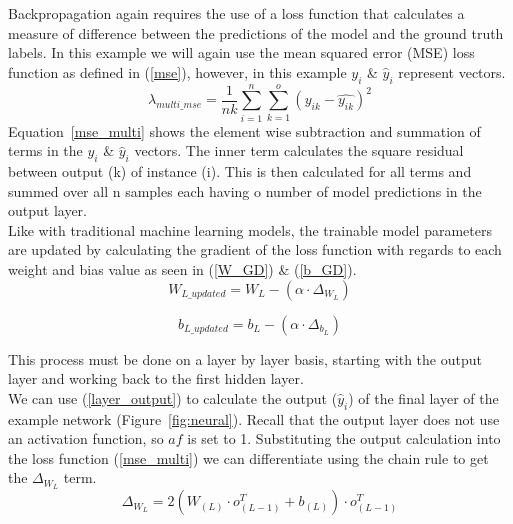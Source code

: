 \noindent
Backpropagation again requires the use of a loss function that calculates a measure of difference between the predictions of the model and the ground truth labels. In this example we will again use the mean squared error (MSE) loss function as defined in (\ref{mse}), however, in this example $y_i$ \& $\hat{y}_i$ represent vectors. \\

\begin{equation} \label{mse_multi}
	\lambda_{multi\_mse} = \frac{1}{nk}\sum_{i=1}^n \sum_{k=1}^o (y_{ik} - \hat{y_{ik}})^2
\end{equation}
%
\noindent
Equation~\ref{mse_multi} shows the element wise subtraction and summation of terms in the $y_i$ \& $\hat{y}_i$ vectors. The inner term calculates the square residual between output (k) of instance (i). This is then calculated for all terms and summed over all n samples each having o number of model predictions in the output layer. \\  

\noindent
Like with traditional machine learning models, the trainable model parameters are updated by calculating the gradient of the loss function with regards to each weight and bias value as seen in (\ref{W_GD}) \& (\ref{b_GD}). \\

 \begin{equation} \label{W_GD}
	W_{L\_updated} = W_L - (\alpha \cdot \Delta_{W_L})
\end{equation}

 \begin{equation} \label{b_GD}
	b_{L\_updated} = b_L - (\alpha \cdot \Delta_{b_L})
\end{equation}

\noindent
This process must be done on a layer by layer basis, starting with the output layer and working back to the first hidden layer. \\

\noindent
We can use (\ref{layer_output})  to calculate the output ($\hat{y}_i$) of the final layer of the example network (Figure~\ref{fig:neural}). Recall that the output layer does not use an activation function, so $af$ is set to 1. Substituting the output calculation into the loss function (\ref{mse_multi}) we can differentiate using the chain rule to get the $\Delta_{W_L}$ term.\\

\begin{equation} \label{delta_W}
	\Delta_{W_L} = 2(W_{(L)} \cdot o_{(L-1)}^T + b_{(L)}) \cdot o_{(L-1)}^T
\end{equation}

